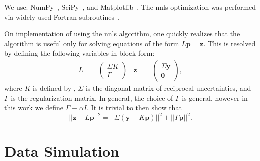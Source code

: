 We use:
NumPy~\cite{2011-vanderWalt-CSE-13-22},
SciPy~\cite{2020-Virtanen-NM},
and Matplotlib~\cite{2007-Hunter-CSE-9-90}.
The \gls{nnls} optimization was performed via widely used Fortran subroutines~\cite{1995-Lawson-SLSP}.

On implementation of  using the \gls{nnls} algorithm, one quickly realizes that the algorithm is useful only for solving equations of the form $L\mathbf{p} = \mathbf{z}$. This is resolved by defining the following variables in block form: 
%
\begin{align}
    L &= 
    \left(\begin{array}{c}
        \Sigma K \\ \Gamma
    \end{array}\right) &
    \mathbf{z} &= \left(\begin{array}{c}
        \Sigma\mathbf{y} \\ \bm{0}
    \end{array}\right),
\end{align}
%
where $K$ is defined by , $\Sigma$ is the diagonal matrix of reciprocal uncertainties, and $\Gamma$ is the regularization matrix. In general, the choice of $\Gamma$ is general, however in this work we define $\Gamma \equiv \alpha I$. It is trivial to then show that 
%
\begin{equation}
||\mathbf{z}-L\mathbf{p}||^2 = ||\Sigma (\mathbf{y} - K\mathbf{p})||^2 + ||\Gamma\mathbf{p}||^2.
\end{equation}
%

\section{ Data Simulation \label{sec:datasim}}

